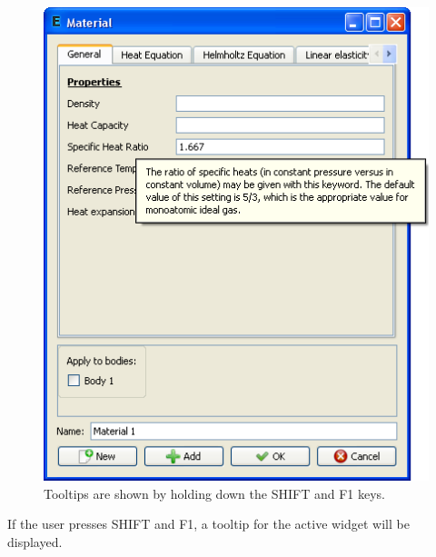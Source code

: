 \documentclass[a4paper,12pt]{article}
\begin{document}
\begin{figure}[ht]
\begin{center}
 \includegraphics[scale=0.5]{images/tooltip.png}
\caption{Tooltips are shown by holding down the SHIFT and F1 keys.}
\end{center}
\end{figure}

If the user presses SHIFT and F1, a tooltip for the active widget will be displayed.
\end{document}
